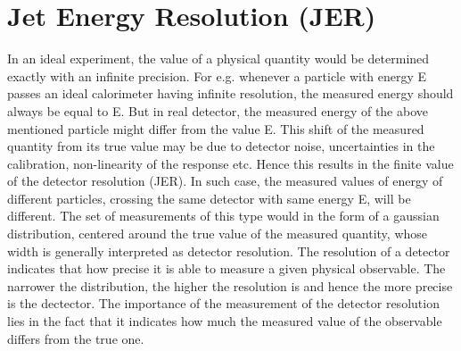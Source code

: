 \section{Jet Energy Resolution (JER)}
\label{sec:Resolution}
In an ideal experiment, the value of a physical quantity would be determined exactly with an infinite precision. For e.g. whenever a particle with energy E passes an ideal calorimeter having infinite resolution, the measured energy should always be equal to E. But in real detector, the measured energy of the above mentioned particle might differ from the value E. This shift of the measured quantity from its true value may be due to detector noise, uncertainties in the calibration, non-linearity of the response etc. Hence this results in the finite value of the detector resolution (JER). In such case, the measured values of energy of different particles, crossing the same detector with same energy E, will be different. The set of measurements of this type would in the form of a gaussian distribution, centered around the true value of the measured quantity, whose width is generally interpreted as detector resolution. The resolution of a detector indicates that how precise it is able to measure a given physical observable. The narrower the distribution, the higher the resolution is and hence the more precise is the dectector. The importance of the measurement of the detector resolution lies in the fact that it indicates how much the measured value of the observable differs from the true one. %

